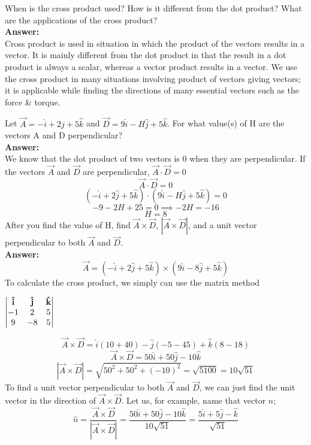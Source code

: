 \documentclass[9pt,addpoints]{exam}
\begin{document}
	\begin{questions}
		\question When is the cross product used? How is it different from the dot product? What are the applications of the cross product? \\ \textbf{Answer:} \\ 
		
		Cross product is used in situation in which the product of the vectors results in a vector. It is mainly different from the dot product in that the result in a dot product is always a scalar, whereas a vector product results in a vector. We use the cross product in many situations involving product of vectors giving vectors; it is applicable while finding the directions of many essential vectors such as the force \& torque.
		
		\question Let $\vec{A}=-\hat{i}+2\hat{j}+5\hat{k}$ and $\vec{D}=9\hat{i}-H\hat{j}+5\hat{k}$. For what value(s) of H are the vectors A and D perpendicular? \\ \textbf{Answer:} \\ 
		We know that the dot product of two vectors is 0 when they are perpendicular. If the vectors $\vec{A}$ and $\vec{D}$ are perpendicular, $\vec{A}\cdot\vec{D}=0$ 
		$$\vec{A}\cdot\vec{D}=0$$
		$$(-\hat{i}+2\hat{j}+5\hat{k})\cdot(9\hat{i}-H\hat{j}+5\hat{k})=0$$
		$$-9-2H+25=0\implies-2H=-16$$
		$$H=8$$
		\question After you find the value of H, find $\vec{A}\times\vec{D}$, $|\vec{A}\times\vec{D}|$, and a unit vector perpendicular to both $\vec{A}$ and $\vec{D}$. \\ \textbf{Answer:} \\ 
		$$\vec{A}=(-\hat{i}+2\hat{j}+5\hat{k})\times(9\hat{i}-8\hat{j}+5\hat{k})$$
		To calculate the cross product, we simply can use the matrix method
		\begin{center}
		$\begin{vmatrix}
			\bf \hat{i} & \bf \hat{j} & \bf \hat{k}\\
			-1 & 2 & 5\\
			9 & -8 & 5 
		\end{vmatrix}$	
		\end{center}
		$$\vec{A}\times\vec{D}=\hat{i}(10+40)-\hat{j}(-5-45)+\hat{k}(8-18)$$
		$$\vec{A}\times\vec{D}=50\hat{i}+50\hat{j}-10\hat{k}$$
		$$|\vec{A}\times\vec{D}|=\sqrt{50^2+50^2+(-10)^2}=\sqrt{5100}=10\sqrt{51}$$
		To find a unit vector perpendicular to both $\vec{A}$ and $\vec{D}$, we can just find the unit vector in the direction of $\vec{A}\times\vec{D}$. Let us, for example, name that vector $\hat{n}$;
		$$\hat{n}=\dfrac{\vec{A}\times\vec{D}}{|\vec{A}\times\vec{D}|}=\dfrac{50\hat{i}+50\hat{j}-10\hat{k}}{10\sqrt{51}}=\dfrac{5\hat{i}+5\hat{j}-\hat{k}}{\sqrt{51}}$$

\end{questions}
\end{document}
